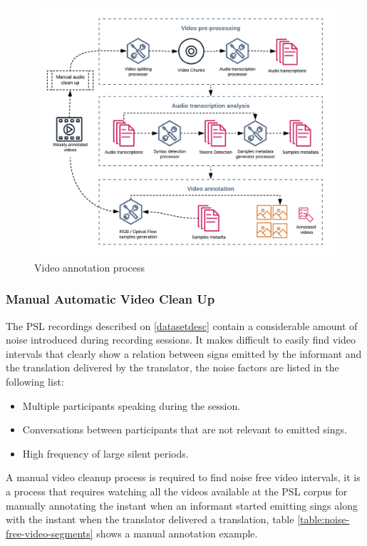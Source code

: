 \documentclass[twocolumn,conference]{article}
\begin{document}
\begin{figure}[hbt!]
\includegraphics[width=\linewidth]{images/video-annotation-pipeline.png}
\caption{Video annotation process}
\label{fig:video-annotation-pipeline}
\end{figure}

\subsubsection{Manual Automatic Video Clean Up}\label{manual-video-cleanup}
The PSL recordings described on \ref{datasetdesc} contain a considerable amount of noise introduced during recording sessions. It makes difficult to easily find video intervals that clearly show a relation between signs emitted by the informant and the translation delivered by the translator, the noise factors are listed in the following list:
\begin{itemize}
	\item Multiple participants speaking during the session.
	\item Conversations between participants that are not relevant to emitted sings.
	\item High frequency of large silent periods.
\end{itemize}
A manual video cleanup process is required to find noise free video intervals, it is a process that requires watching all the videos available at the PSL corpus for manually annotating the instant when an informant started emitting sings along with the instant when the translator delivered a translation, table \ref{table:noise-free-video-segments} shows a manual annotation example.
\end{document}
